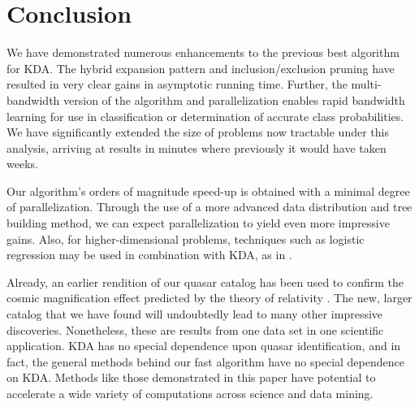 \documentclass[twoside,leqno,twocolumn]{article}
\begin{document}

\section{Conclusion}
We have demonstrated numerous enhancements to the previous best
algorithm for KDA.  The hybrid expansion pattern and
inclusion/exclusion pruning have resulted in very clear gains in
asymptotic running time.  Further, the multi-bandwidth version of the
algorithm and parallelization enables rapid bandwidth learning for use
in classification or determination of accurate class probabilities.
We have significantly extended the size of problems now tractable
under this analysis, arriving at results in minutes where previously
it would have taken weeks.

Our algorithm's orders of magnitude speed-up is obtained with a
minimal degree of parallelization.  Through the use of a more advanced
data distribution and tree building method, we can expect
parallelization to yield even more impressive gains.  Also, for
higher-dimensional problems, techniques such as logistic regression
may be used in combination with KDA, as in
\cite{gray-highdimensional}.

Already, an earlier rendition of our quasar catalog has been used to
confirm the cosmic magnification effect predicted by the theory of
relativity \cite{nature05}.  The new, larger catalog that we have
found will undoubtedly lead to many other impressive discoveries.
Nonetheless, these are results from one data set in one scientific
application.  KDA has no special dependence upon quasar
identification, and in fact, the general methods \cite{nips2000paper}
behind our fast algorithm have no special dependence on KDA.  Methods
like those demonstrated in this paper have potential to accelerate a
wide variety of computations across science and data mining.

\newpage



\end{document}
